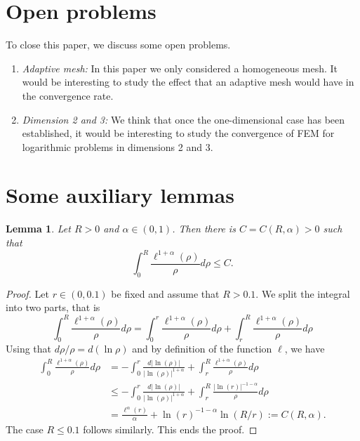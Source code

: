 \documentclass[10 pt]{article}
\newtheorem{lemma}[theorem]{Lemma}
\numberwithin{equation}{section}
\begin{document}
 \section{Open problems}\label{sec:o:p}

 To close this paper, we discuss some open problems.
 \begin{enumerate}
    \item \emph{Adaptive mesh:} In this paper we only considered a homogeneous mesh.  It would be interesting to study the effect that an adaptive mesh would have in the convergence rate.
     \item \emph{Dimension 2 and 3:} We think that once the one-dimensional case has been established, it would be interesting to study the convergence of FEM for logarithmic problems in dimensions 2 and 3.
 \end{enumerate}



\appendix

\section{Some auxiliary lemmas}
%
\begin{lemma}\label{lem:over}
Let $R>0$ and $\alpha\in(0,1)$. Then there is $C=C(R,\alpha)>0$ such that 
%
\begin{equation}
    \int_0^{R} \frac{\ell^{1+\alpha}(\rho)}{\rho}d\rho\leq C.
\end{equation}
%
\end{lemma}
%
\begin{proof}
Let $r\in(0,0.1)$ be fixed and assume that $R>0.1$. We split the integral into two parts, that is
%
\begin{equation*}
    \int_{0}^{R}\frac{\ell^{1+\alpha}(\rho)}{\rho}d\rho=\int_{0}^{r} \frac{\ell^{1+\alpha}(\rho)}{\rho}d\rho + \int_{r}^{R}\frac{\ell^{1+\alpha}(\rho)}{\rho}d\rho
\end{equation*}
%
Using that $d\rho/\rho=d(\ln \rho)$ and by definition of the function $\ell$, we have
%
\begin{align*}
    \int_{0}^{R}\frac{\ell^{1+\alpha}(\rho)}{\rho}d\rho &=-\int_{0}^{r} \frac{d|\ln(\rho)|}{|\ln(\rho)|^{1+\alpha}} + \int_{r}^{R}\frac{\ell^{1+\alpha}(\rho)}{\rho}d\rho 
    \\ &\leq -\int_{0}^{r} \frac{d|\ln(\rho)|}{|\ln(\rho)|^{1+\alpha}} + \int_{r}^{R}\frac{|\ln(r)|^{-1-\alpha}}{\rho}d\rho \\
    &=\frac{\ell^\alpha(r)}{\alpha}+\ln(r)^{-1-\alpha}\ln(R/r):=C(R,\alpha).
\end{align*}
%
The case $R\leq 0.1$ follows similarly. This ends the proof. 
\end{proof}
\end{document}
